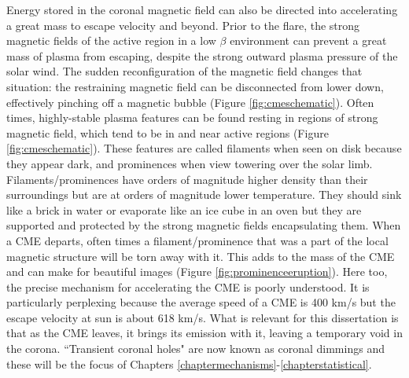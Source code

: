 Energy stored in the coronal magnetic field can also be directed into accelerating a great mass to escape velocity and beyond. Prior to the flare, the strong magnetic fields of the active region in a low $\beta$ environment can prevent a great mass of plasma from escaping, despite the strong outward plasma pressure of the solar wind. The sudden reconfiguration of the magnetic field changes that situation: the restraining magnetic field can be disconnected from lower down, effectively pinching off a magnetic bubble (Figure \ref{fig:cmeschematic}). Often times, highly-stable plasma features can be found resting in regions of strong magnetic field, which tend to be in and near active regions (Figure \ref{fig:cmeschematic}). These features are called filaments when seen on disk because they appear dark, and prominences when view towering over the solar limb. Filaments/prominences have orders of magnitude higher density than their surroundings but are at orders of magnitude lower temperature. They should sink like a brick in water or evaporate like an ice cube in an oven but they are supported and protected by the strong magnetic fields encapsulating them. When a CME departs, often times a filament/prominence that was a part of the local magnetic structure will be torn away with it. This adds to the mass of the CME and can make for beautiful images (Figure \ref{fig:prominenceeruption}). Here too, the precise mechanism for accelerating the CME is poorly understood. It is particularly perplexing because the average speed of a CME is 400 km/s but the escape velocity at sun is about 618 km/s. What is relevant for this dissertation is that as the CME leaves, it brings its emission with it, leaving a temporary void in the corona. ``Transient coronal holes" are now known as coronal dimmings and these will be the focus of Chapters \ref{chaptermechanisms}-\ref{chapterstatistical}. 

